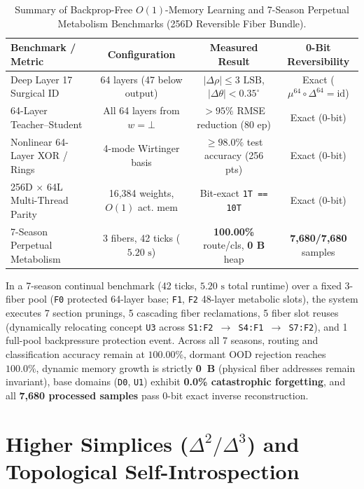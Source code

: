 \documentclass[11pt, a4paper]{article}
\begin{document}
\begin{table}[htbp]
\centering
\small
\caption{Summary of Backprop-Free $O(1)$-Memory Learning and 7-Season Perpetual Metabolism Benchmarks (256D Reversible Fiber Bundle).}
\label{tab:metabolism_bench}
\begin{tabularx}{\textwidth}{@{}Xccc@{}}
\toprule
\textbf{Benchmark / Metric} & \textbf{Configuration} & \textbf{Measured Result} & \textbf{0-Bit Reversibility} \\
\midrule
Deep Layer 17 Surgical ID & 64 layers (47 below output) & $|\Delta\rho| \le 3\text{ LSB}$, $|\Delta\theta| < 0.35^\circ$ & Exact ($\mu^{64}\circ\Delta^{64}=\mathrm{id}$) \\
64-Layer Teacher--Student & All 64 layers from $w=\bot$ & $>95\%$ RMSE reduction (80 ep) & Exact (0-bit) \\
Nonlinear 64-Layer XOR / Rings & 4-mode Wirtinger basis & $\ge 98.0\%$ test accuracy (256 pts) & Exact (0-bit) \\
256D $\times$ 64L Multi-Thread Parity & 16,384 weights, $O(1)$ act. mem & Bit-exact \texttt{1T == 10T} & Exact (0-bit) \\
7-Season Perpetual Metabolism & 3 fibers, 42 ticks ($5.20\text{ s}$) & \textbf{100.00\%} route/cls, \textbf{0 B} heap & \textbf{7,680/7,680} samples \\
\bottomrule
\end{tabularx}
\end{table}

In a 7-season continual benchmark (42 ticks, $5.20\text{ s}$ total runtime) over a fixed 3-fiber pool (\texttt{F0} protected 64-layer base; \texttt{F1}, \texttt{F2} 48-layer metabolic slots), the system executes 7 section prunings, 5 cascading fiber reclamations, 5 fiber slot reuses (dynamically relocating concept \texttt{U3} across \texttt{S1:F2 $\to$ S4:F1 $\to$ S7:F2}), and 1 full-pool backpressure protection event. Across all 7 seasons, routing and classification accuracy remain at $100.00\%$, dormant OOD rejection reaches $100.0\%$, dynamic memory growth is strictly \textbf{0~B} (physical fiber addresses remain invariant), base domains (\texttt{D0}, \texttt{U1}) exhibit \textbf{0.0\% catastrophic forgetting}, and all \textbf{7,680 processed samples} pass 0-bit exact inverse reconstruction.

\section{Higher Simplices ($\Delta^2 / \Delta^3$) and Topological Self-Introspection}
\label{sec:simplicial}
\end{document}
